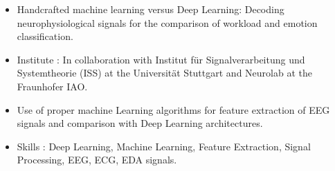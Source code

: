 \documentclass[10pt,a4paper,ragged2e]{altacv}
\begin{document}

\begin{fullwidth}
\makecvheader
\end{fullwidth}





\begin{itemize}
\item Handcrafted machine learning versus Deep Learning: Decoding neurophysiological signals for the comparison of workload and emotion classification.

\item Institute : In collaboration with Institut für Signalverarbeitung und Systemtheorie (ISS) at the Universität Stuttgart and Neurolab at the Fraunhofer IAO.
\item Use of proper machine Learning algorithms for feature extraction of EEG signals and comparison with Deep Learning architectures.
\item Skills : Deep Learning, Machine Learning, Feature Extraction, Signal Processing, EEG, ECG, EDA signals.

\divider

\end{itemize}
\end{document}
